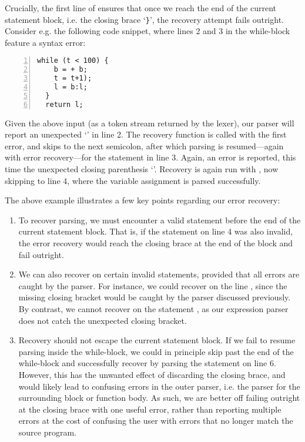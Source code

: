 Crucially, the first line of  ensures that once we reach
the end of the current statement block, i.e. the closing brace `\verb|}|', the
recovery attempt fails outright.
Consider e.g. the following code snippet, where lines 2 and 3 in the
while-block feature a syntax error:
%
\begin{lstlisting}[language=spl,numbers=left]
  while (t < 100) {
    b = + b;
    t = t+1);
    l = b:l;
  }
  return l;
\end{lstlisting}
%
Given the above input (as a token stream returned by the lexer), our parser will
report an unexpected `\code{+}' in line 2. The recovery function
 is called with the first error, and skips to the next
semicolon, after which parsing is resumed---again with error recovery---for the
statement in line 3. Again, an error is reported, this time the unexpected
closing parenthesis `\code{)}'. Recovery is again run with
, now skipping to line 4, where the variable assignment is
parsed successfully.

The above example illustrates a few key points regarding our error recovery:
\begin{enumerate}[label=(\arabic*)]
  \item To recover parsing, we must encounter a valid statement before the end
        of the current statement block. That is, if the statement on line 4 was
        also invalid, the error recovery would reach the closing brace at the
        end of the block and fail outright.
  \item We can also recover on certain invalid statements, provided that all
        errors are caught by the parser. For instance, we could recover on the
        line \spl{l = [;}, since the missing closing bracket would be caught by
        the  parser discussed previously.
        By contrast, we cannot recover on the statement \spl{l = ];}, as our
        expression parser does not catch the unexpected closing bracket.
  \item Recovery should not escape the current statement block. If we fail to
        resume parsing inside the while-block, we could in principle skip past
        the end of the while-block and successfully recover by parsing the
        statement on line 6.
        However, this has the unwanted effect of discarding the closing brace,
        and would likely lead to confusing errors in the outer parser, i.e. the
        parser for the surrounding block or function body.
        As such, we are better off failing outright at the closing brace with
        one useful error, rather than reporting multiple errors at the cost of
        confusing the user with errors that no longer match the source program.
\end{enumerate}


